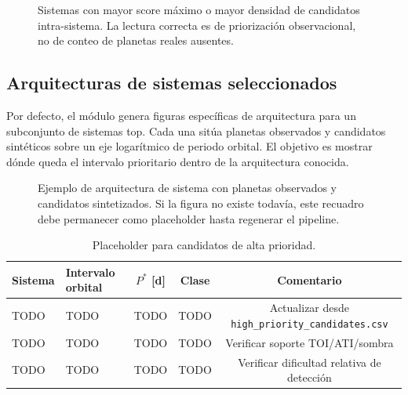 \begin{figure}[H]
\centering
{}
\caption{Sistemas con mayor score m\'aximo o mayor densidad de candidatos intra-sistema. La lectura correcta es de priorizaci\'on observacional, no de conteo de planetas reales ausentes.}
\label{fig:top-systems}
\end{figure}

\subsection{Arquitecturas de sistemas seleccionados}

Por defecto, el m\'odulo genera figuras espec\'ificas de arquitectura para un subconjunto de sistemas top. Cada una sit\'ua planetas observados y candidatos sint\'eticos sobre un eje logar\'itmico de periodo orbital. El objetivo es mostrar d\'onde queda el intervalo prioritario dentro de la arquitectura conocida.

\begin{figure}[H]
\centering
{}
\caption{Ejemplo de arquitectura de sistema con planetas observados y candidatos sintetizados. Si la figura no existe todav\'ia, este recuadro debe permanecer como placeholder hasta regenerar el pipeline.}
\label{fig:system-architecture-example}
\end{figure}

\begin{table}[H]
\centering
\caption{Placeholder para candidatos de alta prioridad.}
\label{tab:high-priority-placeholder}
\begin{tabular}{>{\raggedright\arraybackslash}p{} >{\raggedright\arraybackslash}p{} c c c}
\toprule
Sistema & Intervalo orbital & $P^\ast$ [d] & Clase & Comentario \\
\midrule
TODO & TODO & TODO & TODO & Actualizar desde \texttt{high\_priority\_candidates.csv} \\
TODO & TODO & TODO & TODO & Verificar soporte TOI/ATI/sombra \\
TODO & TODO & TODO & TODO & Verificar dificultad relativa de detecci\'on \\
\bottomrule
\end{tabular}
\end{table}

